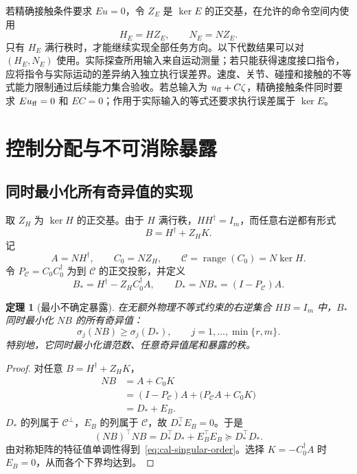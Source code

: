 \documentclass[11pt,a4paper]{article}
\numberwithin{equation}{section}
\newtheorem{theorem}{定理}[section]
\theoremstyle{definition}
\begin{document}
若精确接触条件要求 $Eu=0$，令 $Z_E$ 是 $\ker E$ 的正交基，在允许的命令空间内使用
\begin{equation}
  H_E=HZ_E,\qquad N_E=NZ_E .
  \label{eq:cal-contact-reduction}
\end{equation}
只有 $H_E$ 满行秩时，才能继续实现全部任务方向。以下代数结果可以对 $(H_E,N_E)$ 使用。实际探查所用输入来自运动测量；若只能获得速度接口指令，应将指令与实际运动的差异纳入独立执行误差界。速度、关节、碰撞和接触的不等式能力限制通过后续能力集合验收。若总输入为 $u_{\rm ff}+C\zeta$，精确接触条件同时要求 $Eu_{\rm ff}=0$ 和 $EC=0$；作用于实际输入的等式还要求执行误差属于 $\ker E$。



\section{控制分配与不可消除暴露}
\label{sec:cal-realization}

\subsection{同时最小化所有奇异值的实现}

取 $Z_H$ 为 $\ker H$ 的正交基。由于 $H$ 满行秩，$HH^\dagger=I_m$，而任意右逆都有形式
\begin{equation}
  B=H^\dagger+Z_HK .
  \label{eq:cal-all-lifts}
\end{equation}
记
\begin{equation}
  A=NH^\dagger,\qquad C_0=NZ_H,\qquad
  \mathcal C=\operatorname{range}(C_0)=N\ker H .
\end{equation}
令 $P_{\mathcal C}=C_0C_0^\dagger$ 为到 $\mathcal C$ 的正交投影，并定义
\begin{equation}
  B_*=
  H^\dagger-Z_HC_0^\dagger A,\qquad
  D_*=
  NB_*=(I-P_{\mathcal C})A .
  \label{eq:cal-optimal-lift}
\end{equation}

\begin{theorem}[最小不确定暴露]
\label{thm:cal-singular-opt}
在无额外物理不等式约束的右逆集合 $HB=I_m$ 中，$B_*$ 同时最小化 $NB$ 的所有奇异值：
\begin{equation}
  \sigma_j(NB)\ge\sigma_j(D_*),
  \qquad j=1,\ldots,\min\{r,m\}.
  \label{eq:cal-singular-order}
\end{equation}
特别地，它同时最小化谱范数、任意奇异值尾和暴露的秩。
\end{theorem}

\begin{proof}
对任意 $B=H^\dagger+Z_HK$，
\begin{align}
  NB
  &= A+C_0K\\
  &= (I-P_{\mathcal C})A+
     \big(P_{\mathcal C}A+C_0K\big)\\
  &=D_*+E_B .
\end{align}
$D_*$ 的列属于 $\mathcal C^\perp$，$E_B$ 的列属于 $\mathcal C$，故 $D_*^\top E_B=0$。于是
\begin{equation}
  (NB)^\top NB
  =D_*^\top D_*+E_B^\top E_B
  \succeq D_*^\top D_* .
\end{equation}
由对称矩阵的特征值单调性得到~\eqref{eq:cal-singular-order}。选择 $K=-C_0^\dagger A$ 时 $E_B=0$，从而各个下界均达到。
\end{proof}
\end{document}
